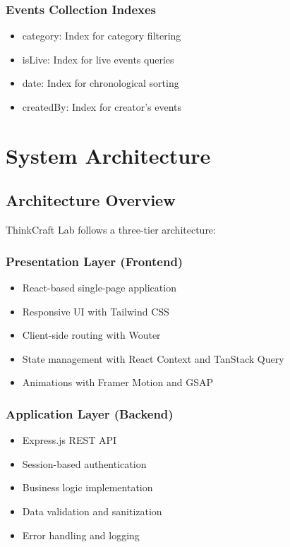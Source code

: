 \documentclass{scrreprt}
\begin{document}
\subsection{Events Collection Indexes}
\begin{itemize}
\item category: Index for category filtering
\item isLive: Index for live events queries
\item date: Index for chronological sorting
\item createdBy: Index for creator's events
\end{itemize}

\chapter{System Architecture}

\section{Architecture Overview}
ThinkCraft Lab follows a three-tier architecture:

\subsection{Presentation Layer (Frontend)}
\begin{itemize}
\item React-based single-page application
\item Responsive UI with Tailwind CSS
\item Client-side routing with Wouter
\item State management with React Context and TanStack Query
\item Animations with Framer Motion and GSAP
\end{itemize}

\subsection{Application Layer (Backend)}
\begin{itemize}
\item Express.js REST API
\item Session-based authentication
\item Business logic implementation
\item Data validation and sanitization
\item Error handling and logging
\end{itemize}
\end{document}
